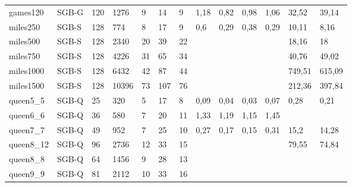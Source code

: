 \documentclass{sig-alternate}
\begin{document}
\begin{table}[b]
{\begin{tabular}{lllllllllllll}
games120 & SGB-G & 120 & 1276 & 9 & 14 & 9 & 1,18 & 0,82 & 0,98 & 1,06 & 32,52 & 39,14 \\
miles250 & SGB-S & 128 & 774 & 8 & 17 & 9 & 0,6 & 0,29 & 0,38 & 0,29 & 10,11 & 8,16 \\
miles500 & SGB-S & 128 & 2340 & 20 & 39 & 22 &  &  &  &  & 18,16 & 18 \\
miles750 & SGB-S & 128 & 4226 & 31 & 65 & 34 &  &  &  &  & 40,76 & 49,02 \\
miles1000 & SGB-S & 128 & 6432 & 42 & 87 & 44 &  &  &  &  & 749,51 & 615,09 \\
miles1500 & SGB-S & 128 & 10396 & 73 & 107 & 76 &  &  &  &  & 212,36 & 397,84 \\
queen5\_5 & SGB-Q & 25 & 320 & 5 & 17 & 8 & 0,09 & 0,04 & 0,03 & 0,07 & 0,28 & 0,21 \\
queen6\_6 & SGB-Q & 36 & 580 & 7 & 20 & 11 & 1,33 & 1,19 & 1,15 & 1,45 &  &  \\
queen7\_7 & SGB-Q & 49 & 952 & 7 & 25 & 10 & 0,27 & 0,17 & 0,15 & 0,31 & 15,2 & 14,28 \\
queen8\_12 & SGB-Q & 96 & 2736 & 12 & 33 & 15 &  &  &  &  & 79,55 & 74,84 \\
queen8\_8 & SGB-Q & 64 & 1456 & 9 & 28 & 13 &  &  &  &  &  &  \\
queen9\_9 & SGB-Q & 81 & 2112 & 10 & 33 & 16 &  &  &  &  &  & 
\end{tabular}
}
\end{table}
\end{document}
